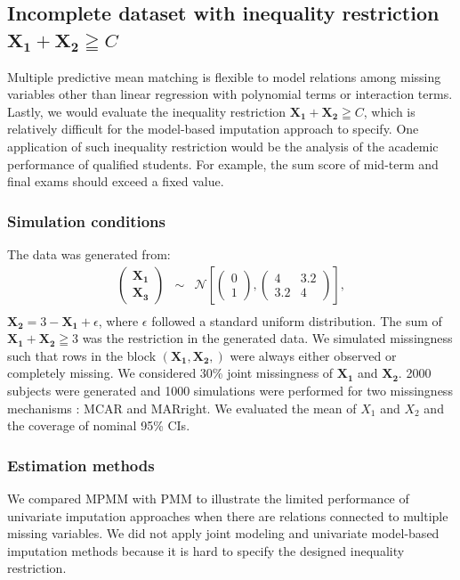 	\subsection{Incomplete dataset with inequality restriction $\boldsymbol{X_1} + \boldsymbol{X_2} \geqq C$}
	\label{sec:3.4.3} 
	Multiple predictive mean matching is flexible to model relations among missing variables other than linear regression with polynomial terms or interaction terms. Lastly, we would evaluate the inequality restriction $\boldsymbol{X_1} + \boldsymbol{X_2} \geqq C$, which is relatively difficult for the model-based imputation approach to specify. One application of such inequality restriction would be the analysis of the academic performance of qualified students. For example, the sum score of mid-term and final exams should exceed a fixed value.  
	
	\subsubsection{Simulation conditions} 
	The data was generated from: 
	\begin{eqnarray*}
		\begin{pmatrix}\boldsymbol{X_{1}}\\
			\boldsymbol{X_{3}}
		\end{pmatrix} & \sim & \mathcal{N}\left[\left(\begin{array}{c}
			0\\
			1
		\end{array}\right),\left(\begin{array}{cc}
			4 & 3.2\\
			3.2 & 4
		\end{array}\right)\right],\\
	\end{eqnarray*}
	$\boldsymbol{X_2} = 3 - \boldsymbol{X_1} + \epsilon$, where $\epsilon$ followed a standard uniform distribution. The sum of $\boldsymbol{X_1} + \boldsymbol{X_2} \geqq 3$ was the restriction in the generated data. We simulated missingness such that rows in the block $(\boldsymbol{X_1, X_2,})$ were always either observed or completely missing. We considered 30\% joint missingness of $\boldsymbol{X_1}$ and $\boldsymbol{X_2}$. 2000 subjects were generated and 1000 simulations were performed for two missingness mechanisms : MCAR and MARright. We evaluated the mean of $X_1$ and $X_2$ and the coverage of nominal 95\% CIs. 
	
	\subsubsection{Estimation methods}
	We compared MPMM with PMM to illustrate the limited performance of univariate imputation approaches when there are relations connected to multiple missing variables. We did not apply joint modeling and univariate model-based imputation methods because it is hard to specify the designed inequality restriction.
	
